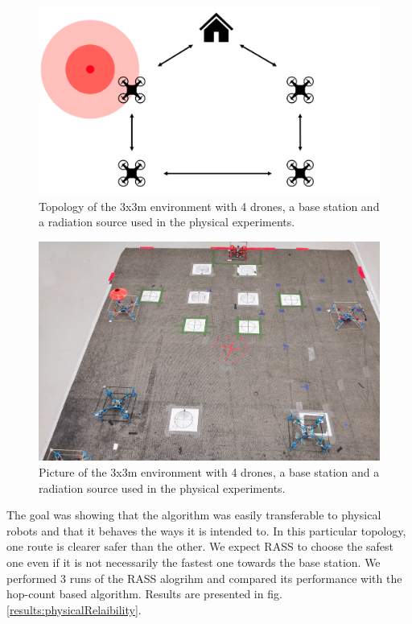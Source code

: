 \begin{figure}[h]
	\centering
    \includegraphics[width=0.7\columnwidth]{images/physical-topology.png}
    \caption{Topology of the 3x3m environment with 4 drones, a base station and a radiation source used in the physical experiments.}
    \label{cogniflyExperiment1}
\end{figure}

\begin{figure}[h]
	\centering
    \includegraphics[width=0.64\columnwidth]{images/cognifly.jpg}
    \caption{Picture of the 3x3m environment with 4 drones, a base station and a radiation source used in the physical experiments.}
    \label{cogniflyExperiment2}
\end{figure}

The goal was showing that the algorithm was easily transferable to physical robots and that it behaves the ways it is intended to. In this particular topology, one route is clearer safer than the other. We expect RASS to choose the safest one even if it is not necessarily the fastest one towards the base station. We performed 3 runs of the RASS alogrihm and compared its performance with the hop-count based algorithm. Results are presented in fig. \ref{results:physicalRelaibility}.

